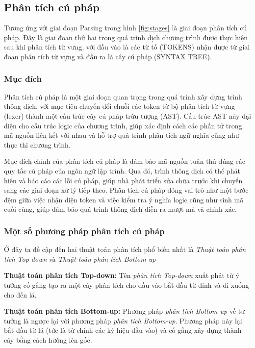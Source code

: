 \subsection{Phân tích cú pháp}

    Tương ứng với giai đoạn Parsing trong hình \ref{fig:stages} là giai đoạn phân tích cú pháp. Đây là giai đoạn thứ hai trong quá trình dịch chương trình được thực hiện sau khi phân tích từ vưng, với đầu vào là các từ tố (TOKENS) nhận được từ giai đoạn phân tích từ vựng và đầu ra là cây cú pháp (SYNTAX TREE).

\subsubsection{Mục đích}
    Phân tích cú pháp là một giai đoạn quan trọng trong quá trình xây dựng trình thông dịch, với mục tiêu chuyển đổi chuỗi các token từ bộ phân tích từ vựng (lexer) thành một cấu trúc cây cú pháp trừu tượng (AST). Cấu trúc AST này đại diện cho cấu trúc logic của chương trình, giúp xác định cách các phần tử trong mã nguồn liên kết với nhau và hỗ trợ quá trình phân tích ngữ nghĩa cũng như thực thi chương trình.

    Mục đích chính của phân tích cú pháp là đảm bảo mã nguồn tuân thủ đúng các quy tắc cú pháp của ngôn ngữ lập trình. Qua đó, trình thông dịch có thể phát hiện và báo cáo các lỗi cú pháp, giúp nhà phát triển sửa chữa trước khi chuyển sang các giai đoạn xử lý tiếp theo. Phân tích cú pháp đóng vai trò như một bước đệm giữa việc nhận diện token và việc kiểm tra ý nghĩa logic cũng như sinh mã cuối cùng, giúp đảm bảo quá trình thông dịch diễn ra mượt mà và chính xác.
\subsubsection{Một số phương pháp phân tích cú pháp}
    Ở đây ta đề cập đến hai thuật toán phân tích phổ biến nhất là \textit{Thuật toán phân tích Top-down} và \textit{Thuật toán phân tích Bottom-up}

\textbf{Thuật toán phân tích Top-down:}
    Tên \textit{phân tích Top-down} xuất phát từ ý tưởng cố gắng tạo ra một cây phân tích cho đầu vào bắt đầu từ đỉnh và đi xuống cho đến lá.

\textbf{Thuật toán phân tích Bottom-up:}
    Phương pháp \textit{phân tích Bottom-up} về tư tưởng là ngược lại với phương pháp \textit{phân tích Bottom-up}. Phương pháp này lại bắt đầu từ lá (tức là từ chính các ký hiệu đầu vào) và cố gắng xây dựng thành cây bằng cách hướng lên gốc.

